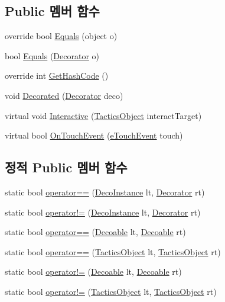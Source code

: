 \subsection*{Public 멤버 함수}
\begin{DoxyCompactItemize}
\item 
override bool \hyperlink{class_m_c_n_1_1_deco_instance_ac327fa53871e183c0e46ac9c66ba00bc}{Equals} (object o)
\item 
bool \hyperlink{class_m_c_n_1_1_deco_instance_a179363468337afa0d1401ff9da1813f0}{Equals} (\hyperlink{class_m_c_n_1_1_decorator}{Decorator} o)
\item 
override int \hyperlink{class_m_c_n_1_1_deco_instance_ab8768bdf4ece9568cc120411c286bfb5}{Get\+Hash\+Code} ()
\item 
void \hyperlink{class_m_c_n_1_1_deco_instance_af6c8520c7bb40840651026e3693afcb4}{Decorated} (\hyperlink{class_m_c_n_1_1_decorator}{Decorator} deco)
\item 
virtual void \hyperlink{class_tactics_object_a5f94ed01497a7072a2785163f4cbc57b}{Interactive} (\hyperlink{class_tactics_object}{Tactics\+Object} interact\+Target)
\item 
virtual bool \hyperlink{class_tactics_object_af34052e62ea471d21e4c601cc79ff717}{On\+Touch\+Event} (\hyperlink{_touch_manager_8cs_ae33e321a424fe84ba8b2fdb81ad40a68}{e\+Touch\+Event} touch)
\end{DoxyCompactItemize}
\subsection*{정적 Public 멤버 함수}
\begin{DoxyCompactItemize}
\item 
static bool \hyperlink{class_m_c_n_1_1_deco_instance_abc697d911069827ae8ead07cd33ee2b9}{operator==} (\hyperlink{class_m_c_n_1_1_deco_instance}{Deco\+Instance} lt, \hyperlink{class_m_c_n_1_1_decorator}{Decorator} rt)
\item 
static bool \hyperlink{class_m_c_n_1_1_deco_instance_a34da62189ea05cbf8e93d50b1132f306}{operator!=} (\hyperlink{class_m_c_n_1_1_deco_instance}{Deco\+Instance} lt, \hyperlink{class_m_c_n_1_1_decorator}{Decorator} rt)
\item 
static bool \hyperlink{class_m_c_n_1_1_decoable_a6004bbc5f208c3031388c9d6e8f8359b}{operator==} (\hyperlink{class_m_c_n_1_1_decoable}{Decoable} lt, \hyperlink{class_m_c_n_1_1_decoable}{Decoable} rt)
\item 
static bool \hyperlink{class_tactics_object_a18f2979a4bf81dc755fbc17e425809f0}{operator==} (\hyperlink{class_tactics_object}{Tactics\+Object} lt, \hyperlink{class_tactics_object}{Tactics\+Object} rt)
\item 
static bool \hyperlink{class_m_c_n_1_1_decoable_aa75e4102ebd7265f577028b407534d27}{operator!=} (\hyperlink{class_m_c_n_1_1_decoable}{Decoable} lt, \hyperlink{class_m_c_n_1_1_decoable}{Decoable} rt)
\item 
static bool \hyperlink{class_tactics_object_a49e235618a22126faa6271243cd89710}{operator!=} (\hyperlink{class_tactics_object}{Tactics\+Object} lt, \hyperlink{class_tactics_object}{Tactics\+Object} rt)
\end{DoxyCompactItemize}
